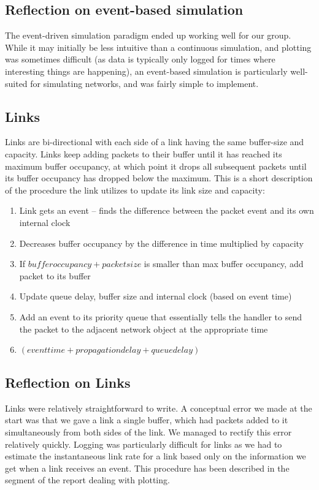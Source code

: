 \documentclass[12pt]{article}
\begin{document}
\subsection*{Reflection on event-based simulation}
The event-driven simulation paradigm ended up working well for our group. While it may initially be less intuitive than a continuous simulation, and plotting was sometimes difficult (as data is typically only logged for times where interesting things are happening), an event-based simulation is particularly well-suited for simulating networks, and was fairly simple to implement.


\subsection{Links}

Links are bi-directional with each side of a link having the same buffer-size and capacity. Links keep adding packets to their buffer until it has reached its maximum buffer occupancy, at which point it drops all subsequent packets until its buffer occupancy has dropped below the maximum. This is a short description of the procedure the link utilizes to update its link size and capacity:

\begin{enumerate}
\item Link gets an event – finds the difference between the packet event and its own internal clock
\item Decreases buffer occupancy by the difference in time multiplied by capacity
\item If $buffer occupancy + packet size$ is smaller than max buffer occupancy, add packet to its buffer
\item Update queue delay, buffer size and internal clock (based on event time)
\item Add an event to its priority queue that essentially tells the handler to send the packet to the adjacent network object at the appropriate time
\item $(event time + propagation delay + queue delay)$
\end{enumerate}

\subsection*{Reflection on Links}

Links were relatively straightforward to write. A conceptual error we made at the start was that we gave a link a single buffer, which had packets added to it simultaneously from both sides of the link. We managed to rectify this error relatively quickly. Logging was particularly difficult for links as we had to estimate the instantaneous link rate for a link based only on the information we get when a link receives an event. This procedure has been described in the segment of the report dealing with plotting. 
\end{document}
